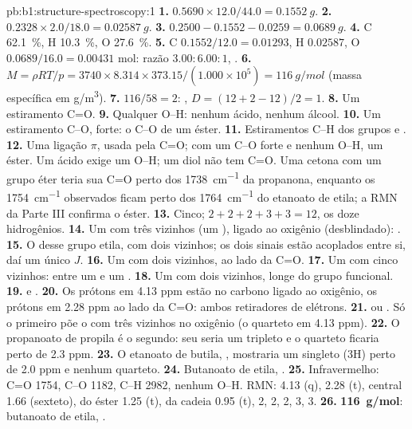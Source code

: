 \begin{solution}{pb:b1:structure-spectroscopy:1}
\textbf{1.} $0.5690 \times 12.0/44.0 = \qty{0.1552}{g}$.
\textbf{2.} $0.2328 \times 2.0/18.0 = \qty{0.02587}{g}$.
\textbf{3.} $0.2500 - 0.1552 - 0.0259 = \qty{0.0689}{g}$.
\textbf{4.} C \qty{62.1}{\percent}, H \qty{10.3}{\percent}, O
\qty{27.6}{\percent}.
\textbf{5.} C $0.1552/12.0 = 0.01293$, H $0.02587$, O $0.0689/16.0 =
0.00431$ mol: razão $3.00 : 6.00 : 1$, .
\textbf{6.} $M = \rho RT/p = 3740 \times 8.314 \times 373.15/(1.000 \times 10^5) =
\qty{116}{g/mol}$ (massa específica em \unit{g/m^3}).
\textbf{7.} $116/58 = 2$: , $D = (12 + 2 - 12)/2 = 1$.
\textbf{8.} Um estiramento C=O.
\textbf{9.} Qualquer O--H: nenhum ácido, nenhum álcool.
\textbf{10.} Um estiramento C--O, forte: o C--O de um éster.
\textbf{11.} Estiramentos C--H dos grupos  e .
\textbf{12.} Uma ligação $\pi$, usada pela C=O; com um C--O forte e
nenhum O--H, um éster. Um ácido exige um O--H; um diol não tem C=O. Uma
cetona com um grupo éter teria sua C=O perto dos \qty{1738}{cm^{-1}} da
propanona, enquanto os \qty{1754}{cm^{-1}} observados ficam perto dos
\qty{1764}{cm^{-1}} do etanoato de etila; a RMN da Parte III confirma o
éster.
\textbf{13.} Cinco; $2 + 2 + 2 + 3 + 3 = 12$, os doze hidrogênios.
\textbf{14.} Um  com três vizinhos (um ), ligado ao
oxigênio (desblindado): .
\textbf{15.} O  desse grupo etila, com dois vizinhos; os dois
sinais estão acoplados entre si, daí um único $J$.
\textbf{16.} Um  com dois vizinhos, ao lado da C=O.
\textbf{17.} Um  com cinco vizinhos: entre um  e um
.
\textbf{18.} Um  com dois vizinhos, longe do grupo funcional.
\textbf{19.}  e .
\textbf{20.} Os prótons em 4.13 ppm estão no carbono ligado ao oxigênio,
os prótons em 2.28 ppm ao lado da C=O: ambos retiradores de elétrons.
\textbf{21.}  ou . Só
o primeiro põe o  com três vizinhos no oxigênio (o quarteto em
4.13 ppm).
\textbf{22.} O propanoato de propila é o segundo: seu  seria um
tripleto e o quarteto ficaria perto de 2.3 ppm.
\textbf{23.} O etanoato de butila, , mostraria um
singleto (3H) perto de 2.0 ppm e nenhum quarteto.
\textbf{24.} Butanoato de etila, .
\textbf{25.} Infravermelho: C=O 1754, C--O 1182, C--H 2982, nenhum O--H.
RMN:  4.13 (q),  2.28 (t),  central 1.66
(sexteto),  do éster 1.25 (t),  da cadeia 0.95 (t),
 2, 2, 2, 3, 3.
\textbf{26.} \textbf{\qty{116}{g/mol}}: butanoato de etila, .
\end{solution}
